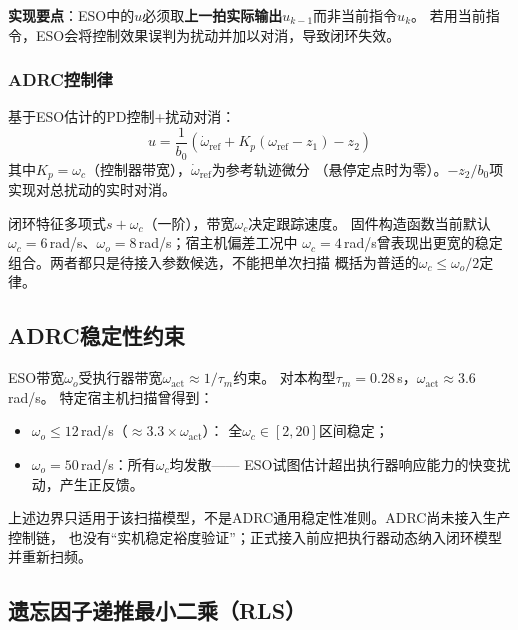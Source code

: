 \textbf{实现要点}：ESO中的$u$必须取\textbf{上一拍实际输出}$u_{k-1}$而非当前指令$u_k$。
若用当前指令，ESO会将控制效果误判为扰动并加以对消，导致闭环失效。

\subsubsection{ADRC控制律}

基于ESO估计的PD控制+扰动对消：
\begin{equation}
    \boxed{
    u = \frac{1}{b_0}\left(\dot{\omega}_{\mathrm{ref}}
        + K_p(\omega_{\mathrm{ref}} - z_1) - z_2\right)
    }
    \label{eq:adrc_law}
\end{equation}
其中$K_p=\omega_c$（控制器带宽），$\dot{\omega}_{\mathrm{ref}}$为参考轨迹微分
（悬停定点时为零）。$-z_2/b_0$项实现对总扰动的实时对消。

闭环特征多项式$s+\omega_c$（一阶），带宽$\omega_c$决定跟踪速度。
固件构造函数当前默认$\omega_c=6$\,rad/s、$\omega_o=8$\,rad/s；宿主机偏差工况中
$\omega_c=4$\,rad/s曾表现出更宽的稳定组合。两者都只是待接入参数候选，不能把单次扫描
概括为普适的$\omega_c\leq\omega_o/2$定律。

\subsection{ADRC稳定性约束}
\label{sec:adrc_stability}

ESO带宽$\omega_o$受执行器带宽$\omega_{\mathrm{act}}\approx1/\tau_m$约束。
对本构型$\tau_m=0.28$\,s，$\omega_{\mathrm{act}}\approx3.6$\,rad/s。
特定宿主机扫描曾得到：
\begin{itemize}
    \item $\omega_o\leq12$\,rad/s（$\approx3.3\times\omega_{\mathrm{act}}$）：
          全$\omega_c\in[2,20]$区间稳定；
    \item $\omega_o=50$\,rad/s：所有$\omega_c$均发散——
          ESO试图估计超出执行器响应能力的快变扰动，产生正反馈。
\end{itemize}
上述边界只适用于该扫描模型，不是ADRC通用稳定性准则。ADRC尚未接入生产控制链，
也没有“实机稳定裕度验证”；正式接入前应把执行器动态纳入闭环模型并重新扫频。

\subsection{遗忘因子递推最小二乘（RLS）}
\label{sec:online_id}
\label{sec:rls}


